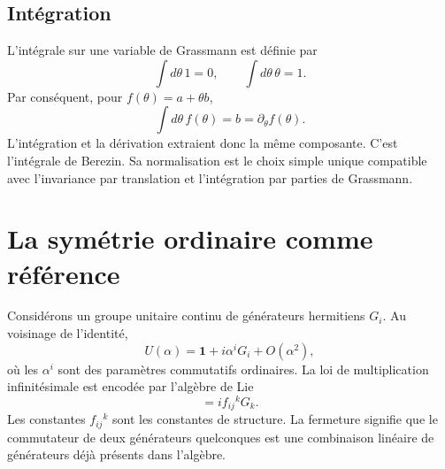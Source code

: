\begin{classroomqa}
\end{classroomqa}

\begin{classroomqa}
\end{classroomqa}

\subsection{Intégration}

L’intégrale sur une variable de Grassmann est définie par
\begin{equation}
\int d\theta\,1=0,
\qquad
\int d\theta\,\theta=1.
\end{equation}
Par conséquent, pour \(f(\theta)=a+\theta b\),
\begin{equation}
\int d\theta\,f(\theta)=b=\partial_\theta f(\theta).
\end{equation}
L’intégration et la dérivation extraient donc la même composante. C’est l’intégrale de Berezin. Sa normalisation est le choix simple unique compatible avec l’invariance par translation et l’intégration par parties de Grassmann. 

\section{La symétrie ordinaire comme référence}

Considérons un groupe unitaire continu de générateurs hermitiens \(G_i\). Au voisinage de l’identité,
\begin{equation}
U(\alpha)=\mathbf 1+i\alpha^iG_i+O(\alpha^2),
\end{equation}
où les \(\alpha^i\) sont des paramètres commutatifs ordinaires. La loi de multiplication infinitésimale est encodée par l’algèbre de Lie
\begin{equation}
[G_i,G_j]=i f_{ij}{}^{k}G_k.
\end{equation}
Les constantes \(f_{ij}{}^k\) sont les constantes de structure. La fermeture signifie que le commutateur de deux générateurs quelconques est une combinaison linéaire de générateurs déjà présents dans l’algèbre.

